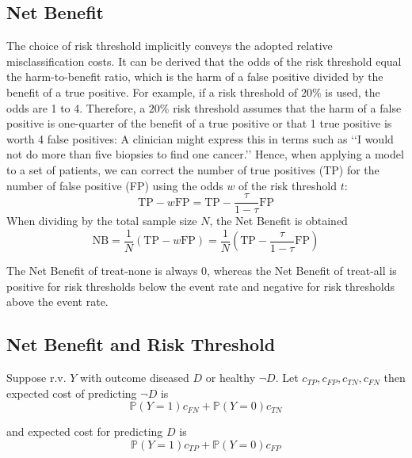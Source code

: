 \subsection{Net Benefit}
	The choice of risk threshold implicitly conveys the adopted relative misclassification costs. 
	It can be derived that the odds of the risk threshold equal the harm-to-benefit ratio, which is the harm of a false positive divided by the benefit of a true positive.
	For example, if a risk threshold of $20\%$ is used, the odds are 1 to 4. 
	Therefore, a $20\%$ risk threshold assumes that the harm of a false positive is one-quarter of the benefit of a true positive or that 1 true positive is worth 4 false positives: 
	A clinician might express this in terms such as ‘‘I would not do more than five biopsies to find one cancer.’’ 
	Hence, when applying a model to a set of patients,
	we can correct the number of true positives (TP) for the number of false positive (FP) using the odds $w$ of the risk threshold $t$: 
	\[
		\text{TP} - w \text{FP} = \text{TP} - \frac{\tau}{1-\tau} \text{FP}
	\]
	When dividing by the total sample size $N$, the Net Benefit is obtained
	\[
		\text{NB} = \frac{1}{N} (\text{TP} - w \text{FP}) = \frac{1}{N} (\text{TP} - \frac{\tau}{1-\tau} \text{FP})
	\]
	
	The Net Benefit of treat-none is always 0, 
	whereas the Net Benefit of treat-all is positive for risk thresholds below the event rate and negative for risk thresholds above the event rate.
	
	
\subsection{Net Benefit and Risk Threshold}
	Suppose r.v. $Y$ with outcome diseased $D$ or healthy $\neg D$.
	Let $c_{TP}, c_{FP}, c_{TN}, c_{FN}$ then expected cost of predicting $\neg D$ is
	\[
		\mathbb{P}(Y = 1) c_{FN} + \mathbb{P}(Y = 0) c_{TN}
	\]
	
	and expected cost for predicting $D$ is
	\[
		\mathbb{P}(Y = 1) c_{TP} + \mathbb{P}(Y = 0) c_{FP}
	\]
	
